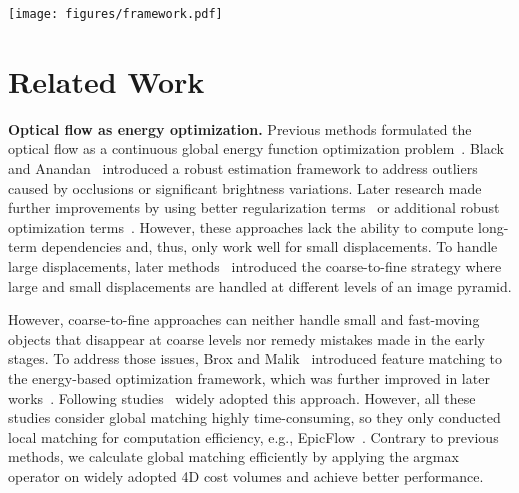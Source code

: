 \documentclass[10pt,twocolumn,letterpaper]{article}
\begin{document}
\begin{figure*}
  \centering
  \texttt{[image: figures/framework.pdf]}
  \caption{\textbf{Overview of GMFlowNet.} GMFlowNet has three components: {\bf 1)} The large context feature extraction module generates initial features from 3 convolutional layers and adopts the proposed POLA to extract large context information.  refers to the number of attention blocks. {\bf 2)} The global matching module adopts large context features and constructs a 4D cost volume. Then, a global matching is built by applying argmax on the cost volume and refined by mutual matching. A coarse flow  is generated from the matching. {\bf 3)} The optimization module takes  as the initial state and updates the flow estimation iteratively.  refers to the number of iterations. We employ the off-the-shelf optimization from RAFT \cite{teed2020raft}.
  } \label{fig:framework}
\end{figure*}

\section{Related Work}
\label{sec:related_work}


{\bf Optical flow as energy optimization.}
Previous methods formulated the optical flow as a continuous global energy function optimization problem~\cite{horn1981determining}. 
Black and Anandan~\cite{black1996cviu} introduced a robust estimation framework to address outliers caused by occlusions or significant brightness variations. Later research made further improvements by using better regularization terms~\cite{brox2004high, ranftl2014, zach2007pr} or additional robust optimization terms~\cite{black1996cviu, bruhn2002}. 
However, these approaches lack the ability to compute long-term dependencies and, thus, only work well for small displacements. 
To handle large displacements, later methods~\cite{Bruhn2005IJCV, brox2004high} introduced the coarse-to-fine strategy where large and small displacements are handled at different levels of an image pyramid.

However, coarse-to-fine approaches can neither handle small and fast-moving objects that disappear at coarse levels nor remedy mistakes made in the early stages. 
To address those issues, Brox and Malik~\cite{brox2010large} introduced feature matching to the energy-based optimization framework, which was further improved in later works~\cite{weinzaepfel2013deepflow, xu2011motion, revaud2015epicflow}. 
Following studies~\cite{Bai2016ExploitingSI, Bailer2017CNNBasedPM, chen2016full, hu2016efficient, Xu2017AccurateOF} widely adopted this approach. 
However, all these studies consider global matching highly time-consuming, so they only conducted local matching for computation efficiency, e.g., EpicFlow~\cite{revaud2015epicflow}. 
Contrary to previous methods, we calculate global matching efficiently by applying the argmax operator on widely adopted 4D cost volumes and achieve better performance.
\end{document}
